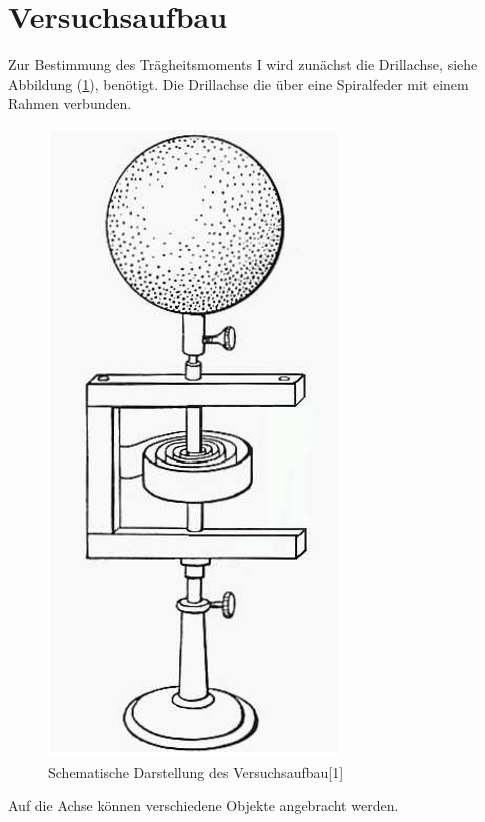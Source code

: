 \section{Versuchsaufbau}
Zur Bestimmung des Trägheitsmoments I wird zunächst die
Drillachse, siehe Abbildung (\ref{fig:Abb2}), benötigt. Die Drillachse
die über eine Spiralfeder mit einem Rahmen verbunden.
\begin{figure}[H]
  \centering
  \includegraphics[width=5 cm , height= 10 cm]{Bild2.jpg}
   \caption{Schematische Darstellung des Versuchsaufbau[1]}
   \label{fig:Abb2}
\end{figure}
Auf die Achse können verschiedene Objekte angebracht werden.
